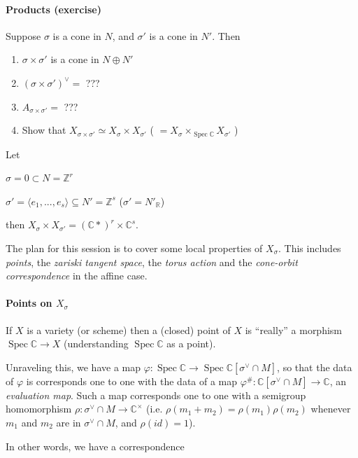 \documentclass[a4paper,12pt]{amsart}
\newcommand{\ZZ}{\mathbb{Z}}
\newcommand{\RR}{\mathbb{R}}
\newcommand{\CC}{\mathbb{C}}
\DeclareMathOperator{\Hom}{Hom}
\DeclareMathOperator{\Spec}{Spec}
\begin{document}
\paragraph{Products (exercise)}
Suppose $\sigma$ is a cone in $N$, and $\sigma'$ is a cone in $N'$. Then 
\begin{enumerate}
	\item $\sigma \times \sigma'$ is a cone in $N \oplus N'$
	\item $(\sigma \times \sigma')^\vee =$ ???
	\item $A_{\sigma \times \sigma'} =$ ???
	\item Show that $X_{\sigma \times \sigma'} \simeq X_\sigma \times X_{\sigma'}$ ( $= X_\sigma \times_{\Spec \CC} X_{\sigma'}$ )
\end{enumerate}

\begin{Eg}
Let

$\sigma = 0 \subset N = \ZZ^r$

$\sigma' = \langle e_1, ..., e_s \rangle \subseteq N' = \ZZ^s$ ($\sigma' = N'_\RR$)

then $X_\sigma \times X_{\sigma'} = (\CC*)^r \times \CC^s$.
\end{Eg}

The plan for this session is to cover some local properties of $X_\sigma$. This includes \textit{points}, the \textit{zariski tangent space}, the \textit{torus action} and the \textit{cone-orbit correspondence} in the affine case.


\paragraph{Points on $X_\sigma$}
If $X$ is a variety (or scheme) then a (closed) point of $X$ is ``really'' a morphism  $\Spec \CC \to X$ (understanding $\Spec \CC$ as a point).

Unraveling this, we have a map $\varphi: \Spec \CC \to \Spec \CC[\sigma^\vee \cap M]$, so that the data of $\varphi$ is corresponds one to one with the data of a map $\varphi^\#: \CC[\sigma^\vee \cap M] \to \CC$, an \textit{evaluation map}. Such a map corresponds one to one with a semigroup homomorphism $\rho: \sigma^\vee \cap M \to \CC^\times$ (i.e. $\rho(m_1 + m_2) = \rho(m_1) \rho(m_2)$ whenever $m_1$ and $m_2$ are in $\sigma^\vee \cap M$, and $\rho(id) = 1$).

In other words, we have a correspondence 
\begin{center}
\end{center}
\end{document}

